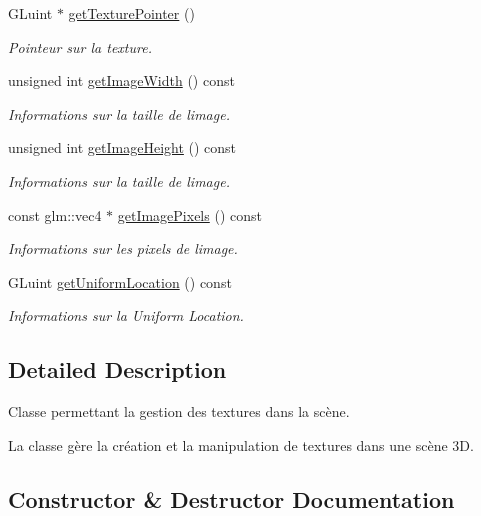 \begin{DoxyCompactItemize}
G\+Luint $\ast$ \hyperlink{classglimac_1_1Texture_ac222b4e2c040a8b64484bb60eb73574f}{get\+Texture\+Pointer} ()
\begin{DoxyCompactList}\small\item\em Pointeur sur la texture. \end{DoxyCompactList}\item 
unsigned int \hyperlink{classglimac_1_1Texture_a68dac46277c6e48989bc2be07ebc2fec}{get\+Image\+Width} () const
\begin{DoxyCompactList}\small\item\em Informations sur la taille de l\textquotesingle{}image. \end{DoxyCompactList}\item 
unsigned int \hyperlink{classglimac_1_1Texture_a3b8c146aace8d5ebdca71f08f470283a}{get\+Image\+Height} () const
\begin{DoxyCompactList}\small\item\em Informations sur la taille de l\textquotesingle{}image. \end{DoxyCompactList}\item 
const glm\+::vec4 $\ast$ \hyperlink{classglimac_1_1Texture_a7060818013d2bfbe42df5d0b01f2825d}{get\+Image\+Pixels} () const
\begin{DoxyCompactList}\small\item\em Informations sur les pixels de l\textquotesingle{}image. \end{DoxyCompactList}\item 
G\+Luint \hyperlink{classglimac_1_1Texture_aa2628c4f632bc1ec28cb08ca81955df8}{get\+Uniform\+Location} () const
\begin{DoxyCompactList}\small\item\em Informations sur la Uniform Location. \end{DoxyCompactList}\end{DoxyCompactItemize}


\subsection{Detailed Description}
Classe permettant la gestion des textures dans la scène. 

La classe gère la création et la manipulation de textures dans une scène 3D. 

\subsection{Constructor \& Destructor Documentation}
\mbox{\label{classglimac_1_1Texture_ac5ae4d92bf698dd77fb8135ae2329102}} 
